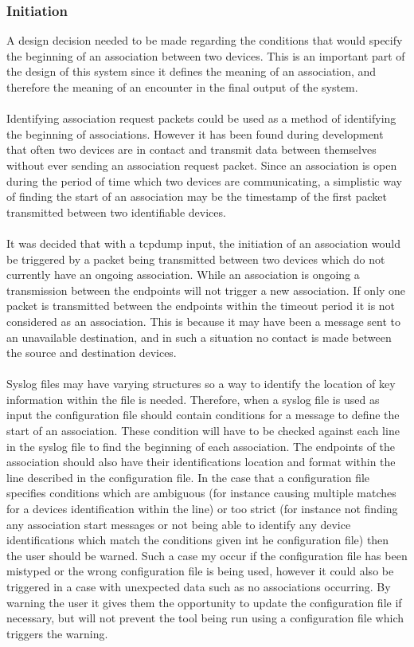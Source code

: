 \subsubsection{Initiation} 
A design decision needed to be made regarding the conditions that would specify the beginning of an association between two devices. This is an important part of the design of this system since it defines the meaning of an association, and therefore the meaning of an encounter in the final output of the system.\\\\
Identifying association request packets could be used as a method of identifying the beginning of associations. However it has been found during development that often two devices are in contact and transmit data between themselves without ever sending an association request packet. Since an association is open during the period of time which two devices are communicating, a simplistic way of finding the start of an association may be the timestamp of the first packet transmitted between two identifiable devices.\\\\
It was decided that with a tcpdump input, the initiation of an association would be triggered by a packet being transmitted between two devices which do not currently have an ongoing association. While an association is ongoing a transmission between the endpoints will not trigger a new association. If only one packet is transmitted between the endpoints within the timeout period it is not considered as an association. This is because it may have been a message sent to an unavailable destination, and in such a situation no contact is made between the source and destination devices.\\\\
Syslog files may have varying structures so a way to identify the location of key information within the file is needed. Therefore, when a syslog file is used as input the configuration file should contain conditions for a message to define the start of an association. These condition will have to be checked against each line in the syslog file to find the beginning of each association. The endpoints of the association should also have their identifications location and format within the line described in the configuration file. In the case that a configuration file specifies conditions which are ambiguous (for instance causing multiple matches for a devices identification within the line) or too strict (for instance not finding any association start messages or not being able to identify any device identifications which match the conditions given int he configuration file) then the user should be warned. Such a case my occur if the configuration file has been mistyped or the wrong configuration file is being used, however it could also be triggered in a case with unexpected data such as no associations occurring. By warning the user it gives them the opportunity to update the configuration file if necessary, but will not prevent the tool being run using a configuration file which triggers the warning.

